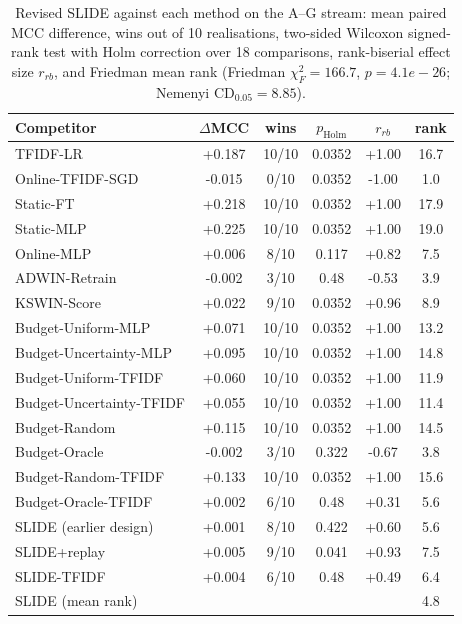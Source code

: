 \begin{table}[t]
\centering
\caption{Revised SLIDE against each method on the A--G stream: mean paired MCC difference, wins out of 10 realisations, two-sided Wilcoxon signed-rank test with Holm correction over 18 comparisons, rank-biserial effect size $r_{rb}$, and Friedman mean rank (Friedman $\chi^2_F=166.7$, $p=4.1e-26$; Nemenyi CD$_{0.05}=8.85$).}
\label{tab:rev-stats}
\scriptsize
\setlength{\tabcolsep}{3pt}
\begin{tabular}{@{}lccccc@{}}
\toprule
Competitor & $\Delta$MCC & wins & $p_{\mathrm{Holm}}$ & $r_{rb}$ & rank \\
\midrule
TFIDF-LR & +0.187 & 10/10 & 0.0352 & +1.00 & 16.7 \\
Online-TFIDF-SGD & -0.015 & 0/10 & 0.0352 & -1.00 & 1.0 \\
Static-FT & +0.218 & 10/10 & 0.0352 & +1.00 & 17.9 \\
Static-MLP & +0.225 & 10/10 & 0.0352 & +1.00 & 19.0 \\
Online-MLP & +0.006 & 8/10 & 0.117 & +0.82 & 7.5 \\
ADWIN-Retrain & -0.002 & 3/10 & 0.48 & -0.53 & 3.9 \\
KSWIN-Score & +0.022 & 9/10 & 0.0352 & +0.96 & 8.9 \\
Budget-Uniform-MLP & +0.071 & 10/10 & 0.0352 & +1.00 & 13.2 \\
Budget-Uncertainty-MLP & +0.095 & 10/10 & 0.0352 & +1.00 & 14.8 \\
Budget-Uniform-TFIDF & +0.060 & 10/10 & 0.0352 & +1.00 & 11.9 \\
Budget-Uncertainty-TFIDF & +0.055 & 10/10 & 0.0352 & +1.00 & 11.4 \\
Budget-Random & +0.115 & 10/10 & 0.0352 & +1.00 & 14.5 \\
Budget-Oracle & -0.002 & 3/10 & 0.322 & -0.67 & 3.8 \\
Budget-Random-TFIDF & +0.133 & 10/10 & 0.0352 & +1.00 & 15.6 \\
Budget-Oracle-TFIDF & +0.002 & 6/10 & 0.48 & +0.31 & 5.6 \\
SLIDE (earlier design) & +0.001 & 8/10 & 0.422 & +0.60 & 5.6 \\
SLIDE+replay & +0.005 & 9/10 & 0.041 & +0.93 & 7.5 \\
SLIDE-TFIDF & +0.004 & 6/10 & 0.48 & +0.49 & 6.4 \\
\midrule
SLIDE (mean rank) &  &  &  &  & 4.8 \\
\bottomrule
\end{tabular}
\end{table}
